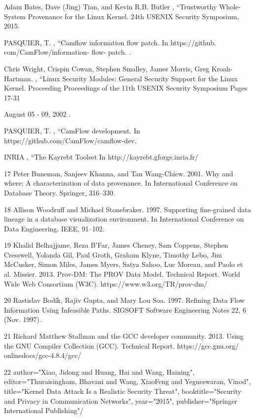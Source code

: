 \documentclass{IEEEtran}
\begin{document}
\begin{thebibliography}{00}
 Adam Bates, Dave (Jing) Tian, and Kevin R.B. Butler , ``Trustworthy Whole-System Provenance
for the Linux Kernel.
24th USENIX Security Symposium, 2015.








 PASQUIER, T. , ``Camflow information flow patch.
In https://github. com/CamFlow/information- flow- patch.
.


 	Chris Wright,	
Crispin Cowan,	
Stephen Smalley,	
James Morris,	
Greg Kroah-Hartman.	
, ``Linux Security Modules: General Security Support for the Linux Kernel.
Proceeding
Proceedings of the 11th USENIX Security Symposium
Pages 17-31 

August 05 - 09, 2002 .


 PASQUIER, T. , ``CamFlow development.
In https://github.com/CamFlow/camflow-dev.

 INRIA , ``The Kayrebt Toolset
In http://kayrebt.gforge.inria.fr/


17 Peter Buneman, Sanjeev Khanna, and Tan Wang-Chiew. 2001. Why and where:
A characterization of data provenance. In International Conference on Database
Theory. Springer, 316–330.


18 Allison Woodruff and Michael Stonebraker. 1997. Supporting fine-grained data
lineage in a database visualization environment. In International Conference on
Data Engineering. IEEE, 91–102.

19 Khalid Belhajjame, Reza B’Far, James Cheney, Sam Coppens, Stephen Cresswell,
Yolanda Gil, Paul Groth, Graham Klyne, Timothy Lebo, Jim McCusker, Simon
Miles, James Myers, Satya Sahoo, Luc Moreau, and Paolo et al. Missier. 2013.
Prov-DM: The PROV Data Model. Technical Report. World Wide Web Consortium
(W3C). https://www.w3.org/TR/prov-dm/

20  Rastislav Bodík, Rajiv Gupta, and Mary Lou Soa. 1997. Refining Data Flow
Information Using Infeasible Paths. SIGSOFT Software Engineering Notes 22, 6
(Nov. 1997).

21 Richard Matthew Stallman and the GCC developer community. 2013. Using
the GNU Compiler Collection (GCC). Technical Report. https://gcc.gnu.org/
onlinedocs/gcc-4.8.4/gcc/

22 author="Xiao, Jidong
and Huang, Hai
and Wang, Haining",
editor="Thuraisingham, Bhavani
and Wang, XiaoFeng
and Yegneswaran, Vinod",
title="Kernel Data Attack Is a Realistic Security Threat",
booktitle="Security and Privacy in Communication Networks",
year="2015",
publisher="Springer International Publishing"/


\end{thebibliography}
\end{document}
